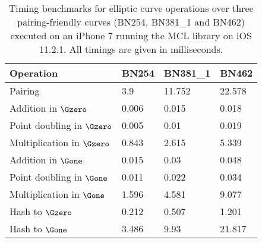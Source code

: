 
	

\begin{table}[H]
	\begin{center}
		\begin{tabular}{l||l|l|l}
		Operation            		 & BN254 & BN381\_1  & BN462  \\
		\hline
		Pairing           			 & 3.9   & 11.752 & 22.578 \\
		Addition in $\Gzero$ 		 & 0.006 & 0.015  & 0.018  \\
		Point doubling in $\Gzero$   & 0.005 & 0.01   & 0.019  \\
		Multiplication in $\Gzero$   & 0.843 & 2.615  & 5.339  \\
		Addition in $\Gone$ 		     & 0.015 & 0.03   & 0.048  \\
		Point doubling in $\Gone$    & 0.011 & 0.022  & 0.034  \\
		Multiplication in $\Gone$    & 1.596 & 4.581  & 9.077  \\
		Hash to $\Gzero$             & 0.212 & 0.507  & 1.201  \\
		Hash to $\Gone$              & 3.486 & 9.93   & 21.817 \\
		\end{tabular}
		\caption{Timing benchmarks for elliptic curve operations over three pairing-friendly curves (BN254, BN381\_1 and BN462) executed on an iPhone 7 running the MCL library \cite{MCLLib} on iOS 11.2.1. All timings are given in milliseconds. \cite{MCLBench}}
		\label{table:benchmarks}
	\end{center}
\end{table}